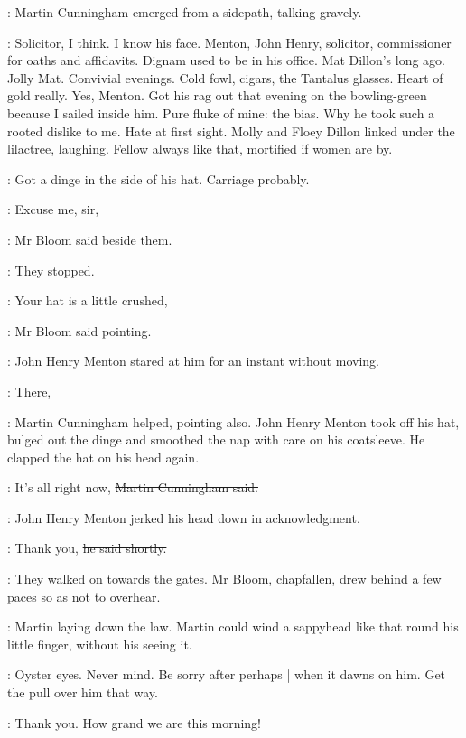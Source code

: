 :
Martin Cunningham emerged from a sidepath, talking gravely.

\BloomInt:
Solicitor, I think.
I know his face.
Menton, John Henry, solicitor,
commissioner for oaths and affidavits.
Dignam used to be in his office.
Mat Dillon's long ago.
Jolly Mat.
Convivial evenings.
Cold fowl, cigars, the Tantalus glasses.
Heart of gold really.
Yes, Menton.
Got his rag out that evening on the bowling-green
because I sailed inside him.
Pure fluke of mine:
the bias.
Why he took such a rooted dislike to me.
Hate at first sight.
Molly and Floey Dillon linked under the lilactree, laughing.
Fellow always like that, mortified if women are by.

\BloomInt:
Got a dinge in the side of his hat.
Carriage probably.

\Bloom:
Excuse me, sir,

:
Mr Bloom said beside them.

:
They stopped.

\Bloom:
Your hat is a little crushed,

:
Mr Bloom said pointing.

:
John Henry Menton stared at him for an instant without moving.

\cunningham:
There,

:
Martin Cunningham helped, pointing also.
John Henry Menton took off his hat,
bulged out the dinge
and smoothed the nap with care on his coatsleeve.
He clapped the hat on his head again.

\cunningham:
It's all right now,
\sout{Martin Cunningham said.}

:
John Henry Menton jerked his head down in acknowledgment.

\menton:
Thank you,
\sout{he said shortly.}

:
They walked on towards the gates.
Mr Bloom, chapfallen, drew behind a few paces so as not to overhear.

\BloomInt:
Martin laying down the law.
Martin could wind a sappyhead like that round his little finger,
without his seeing it.%

\BloomInt:
Oyster eyes.
Never mind.
Be sorry after perhaps |
when it dawns on him.
Get the pull over him that way.

\BloomInt:
Thank you.
How grand we are this morning!

